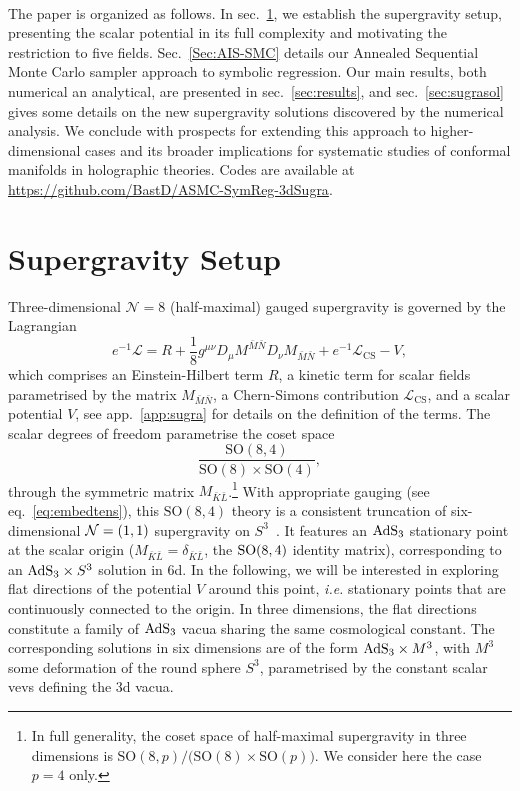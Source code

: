 \documentclass[11pt,a4paper]{article}
\newcommand{\bK}{{\bar{K}}}
\newcommand{\bL}{{\bar{L}}}
\newcommand{\bM}{{\bar{M}}}
\newcommand{\bN}{{\bar{N}}}
\begin{document}
\paragraph{}
The paper is organized as follows. In sec.~\ref{sec:sugra}, we establish the supergravity setup, presenting the scalar potential in its full complexity and motivating the restriction to five fields. Sec.~\ref{Sec:AIS-SMC} details our Annealed Sequential Monte Carlo sampler approach to symbolic regression. Our main results, both numerical an analytical, are presented in sec.~\ref{sec:results}, and sec.~\ref{sec:sugrasol} gives some details on the new supergravity solutions discovered by the numerical analysis. We conclude with prospects for extending this approach to higher-dimensional cases and its broader implications for systematic studies of conformal manifolds in holographic theories. Codes are available at \url{https://github.com/BastD/ASMC-SymReg-3dSugra}.


\section{Supergravity Setup} \label{sec:sugra}
Three-dimensional $\mathcal{N}=8$ (half-maximal) gauged supergravity is governed by the Lagrangian~\cite{Nicolai:2001ac,deWit:2003ja}
%
\begin{equation}	\label{eq: lagrangian_rephrased} 
	e^{-1}\mathcal{L}=R+\frac1{8}g^{\mu\nu}D_\mu M^{\bM\bN}D_\nu M_{\bM\bN}+e^{-1}\mathcal{L}_{\text{CS}}-V,
\end{equation}
%
which comprises an Einstein-Hilbert term $R$, a kinetic term for scalar fields parametrised by the matrix $M_{\bM\bN}$, a Chern-Simons contribution $\mathcal{L}_{\text{CS}}$, and a scalar potential $V$, see app.~\ref{app:sugra} for details on the definition of the terms. The scalar degrees of freedom parametrise the coset space
%
\begin{equation}	\label{eq: scalarcoset_rephrased}
	\frac{\text{SO}(8,4)}{\text{SO}(8)\times\text{SO}(4)},
\end{equation}
%
through the symmetric matrix $M_{\bK\bL}$.\footnote{In full generality, the coset space of half-maximal supergravity in three dimensions is $\text{SO}(8,p)/\big(\text{SO}(8)\times\text{SO}(p)\big)$. We consider here the case $p=4$ only.} With appropriate gauging (see eq.~\eqref{eq:embedtens}), this $\text{SO}(8,4)$ theory is a consistent truncation of six-dimensional ${\cal N}=(1,1)$ supergravity on $S^{3}$~\cite{Cvetic:2000dm,Deger:2014ofa,Hohm:2017wtr}. It features an ${\rm AdS}_{3}$ stationary point at the scalar origin ($M_{\bK\bL}=\delta_{\bK\bL}$, the ${\rm SO}(8,4)$ identity matrix), corresponding to an ${\rm AdS}_{3}\times S^{3}$ solution in 6d. In the following, we will be interested in exploring flat directions of the potential $V$ around this point, \textit{i.e.} stationary points that are continuously connected to the origin. In three dimensions, the flat directions constitute a family of ${\rm AdS}_{3}$ vacua sharing the same cosmological constant. The corresponding solutions in six dimensions are of the form ${\rm AdS}_{3}\times M^{3}$, with $M^{3}$ some deformation of the round sphere $S^{3}$, parametrised by the constant scalar vevs defining the 3d vacua.
\end{document}
